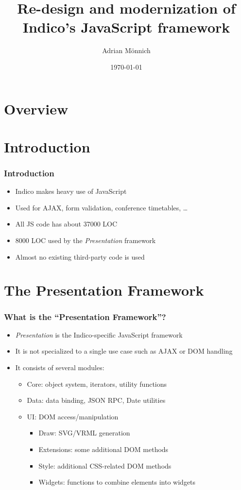 \documentclass{beamer}
\date{\today}
\title{Re-design and modernization of Indico's JavaScript framework}
\author{Adrian Mönnich}
\institute[Hochschule Karlsruhe and CERN]{
  Fakultät für Informatik und Wirtschaftsinformatik\\
  Hochschule Karlsruhe
  \and
  IT-UDS-AVC\\
  CERN
}
\begin{document}
\maketitle
\section*{Overview}
\frame{\tableofcontents}

\section{Introduction}
\begin{frame}
  \frametitle{Introduction}
  \begin{itemize}
    \item Indico makes heavy use of JavaScript
    \item Used for AJAX, form validation, conference timetables, \ldots
    \item All JS code has about 37000 LOC
    \item 8000 LOC used by the \emph{Presentation} framework
    \item Almost no existing third-party code is used
  \end{itemize}
\end{frame}

\section{The Presentation Framework}
\begin{frame}
  \frametitle{What is the \enquote{Presentation Framework}?}
  \begin{itemize}
    \item \emph{Presentation} is the Indico-specific JavaScript framework
    \item It is not specialized to a single use case such as AJAX or DOM handling
    \item It consists of several modules:
    \begin{itemize}
      \item Core: object system, iterators, utility functions
      \item Data: data binding, JSON RPC, Date utilities
      \item UI: DOM access/manipulation
      \begin{itemize}
        \item Draw: SVG/VRML generation
        \item Extensions: some additional DOM methods
        \item Style: additional CSS-related DOM methods
        \item Widgets: functions to combine elements into widgets
      \end{itemize}
    \end{itemize}
  \end{itemize}
\end{frame}
\end{document}
